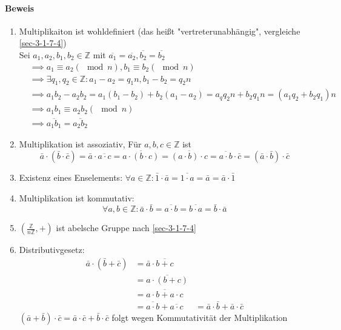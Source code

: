\documentclass[a4paper]{scrartcl}
\DeclareMathOperator{\Forall}{\forall}
\theoremstyle{definition}
\theoremstyle{plain}
\theoremstyle{plain}
\theoremstyle{remark}
\theoremstyle{remark}
\theoremstyle{remark}
\theoremstyle{remark}
\theoremstyle{remark}
\begin{document}
\paragraph{Beweis}
\label{sec-3-2-4-1}
\begin{enumerate}
\item Multiplikaiton ist wohldefiniert (das heißt "vertreterunabhängig", vergleiche \ref{sec-3-1-7-4}) \\
        Sei $a_1,a_2,b_1,b_2 \in\mathbb{Z}$ mit $\overline{a_1} = \overline{a_2},\overline{b_2} = \overline{b_2}$
\begin{align}
&\implies a_1 \equiv a_2 (\mod n), b_1\equiv b_2 (\mod n) \\
&\implies \exists q_1,q_2\in\mathbb{Z}:a_1 - a_2 = q_1 n, b_1 - b_2 = q_2 n \\
&\implies a_1 b_2 - a_2 b_2 = a_1(b_1 - b_2) + b_2 (a_1 - a_2) = a_q q_2 n + b_2 q_1 n = (a_1 q_2 + b_2 q_1) n \\
&\implies a_1 b_1 \equiv a_2 b_2 (\mod n) \\
&\implies \overline{a_1 b_1} = \overline{a_2 b_2}
\end{align}
\item Multiplikation ist assoziativ, Für $a,b,c\in\mathbb{Z}$ ist
\[\bar a\cdot (\bar b\cdot \bar c) = \bar a \cdot \overline{a\cdot c} = \overline{a\cdot(b\cdot c)} = \overline{(a\cdot b)\cdot c} = \overline{a\cdot b} \cdot \bar c = (\bar a\cdot \bar b) \cdot \bar c\]
\item Existenz eines Enselements: $\Forall a\in\mathbb{Z}:\bar 1 \cdot \bar a = \overline{1\cdot a} = \bar a = \bar a\cdot \bar 1$
\item Multiplikation ist kommutativ:
\[\Forall a,b\in\mathbb{Z}:\bar a\cdot \bar b = \overline{a\cdot b} = \overline{b\cdot a} = \bar b \cdot \bar a\]
\item $(\frac{\mathbb{Z}}{n\mathbb{Z}},+)$ ist abelsche Gruppe nach \ref{sec-3-1-7-4}
\item Distributivgesetz:
\begin{align}
\bar a\cdot (\bar b + \bar c) &= \bar a \cdot \overline{b + c} \\
&= \overline{a\cdot (b + c)} \\
&= \overline{a\cdot b + a\cdot c} \\
&= \overline{a\cdot b} + \overline{a\cdot c}
&= \bar a\cdot \bar b + \bar a \cdot\bar c
\end{align}
$(\bar a + \bar b)\cdot \bar c = \bar a\cdot \bar c + \bar b \cdot \bar c$ folgt wegen Kommutativität der Multiplikation
\end{enumerate}
\end{document}
